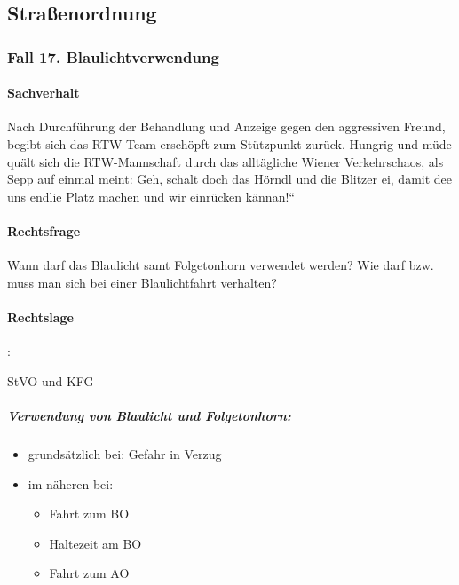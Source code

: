 \subsection{Stra{\ss}enordnung}

\subsubsection{Fall 17. Blaulichtverwendung}

\paragraph*{Sachverhalt}

Nach Durchf\"uhrung der Behandlung und Anzeige gegen den aggressiven
Freund, begibt sich das RTW-Team ersch\"opft zum St\"utzpunkt zur\"uck.
Hungrig und m\"ude quält sich die RTW-Mannschaft durch das
alltägliche Wiener Verkehrschaos, als Sepp auf einmal meint:
{\quotedblbase} Geh, schalt doch das H\"orndl und die Blitzer ei, damit
dee uns endlie Platz machen und wir einr\"ucken
kännan!{\textquotedblleft}

\paragraph*{Rechtsfrage}

Wann darf das Blaulicht samt Folgetonhorn verwendet werden? Wie darf
bzw. muss man sich bei einer Blaulichtfahrt verhalten?

\paragraph*{Rechtslage}

{\mdseries
{}:}

{\mdseries
{} StVO und 
KFG}

\subparagraph*{Verwendung von Blaulicht und Folgetonhorn:}

\begin{itemize}
	\item {\mdseries
	grundsätzlich bei: Gefahr in Verzug}

	\item {\mdseries
	im näheren bei:}

	\begin{itemize}
		\item {\mdseries
		Fahrt zum BO}

		\item {\mdseries
		Haltezeit am BO}

		\item {\mdseries
		Fahrt zum AO}

	\end{itemize}
\end{itemize}

